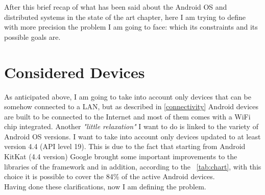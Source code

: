 After this brief recap of what has been said about the Android OS and distributed systems in the state of the art chapter, here I am trying to define with more precision the problem I am going to face: which its constraints and its possible goals are.

\section{Considered Devices}
As anticipated above, I am going to take into account only devices that can be somehow connected to a LAN, but as described in \ref{connectivity} Android devices are built to be connected to the Internet and most of them comes with a WiFi chip integrated. Another \textit{"little relaxation"} I want to do is linked to the variety of Android OS versions. I want to take into account only devices updated to at least version 4.4 (API level 19). This is due to the fact that starting from Android KitKat (4.4 version) Google brought some important improvements  to the libraries of the framework and in addition, according to the \tablename~\ref{tab:chart}, with this choice it is possible to cover the 84\% of the active Android devices.\\
Having done these clarifications, now I am defining the problem.

